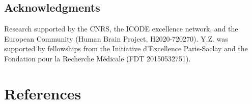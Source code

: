 \documentclass[8pt, colorlinks, a4paper]{article}
\begin{document}
\subsection*{Acknowledgments} 

Research supported by the CNRS, the ICODE excellence network, and the
European Community (Human Brain Project, H2020-720270).  Y.Z. was
supported by fellowships from the Initiative d'Excellence Paris-Saclay
and the Fondation pour la Recherche M\'edicale (FDT 20150532751).

\section{References}
\label{sec-6}
\small


\end{document}
